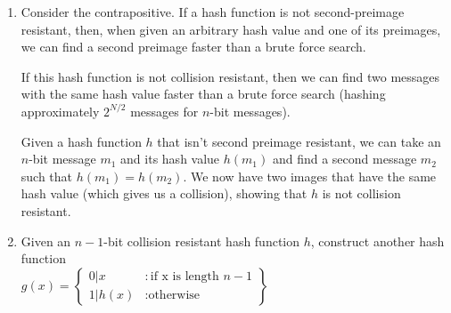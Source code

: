 
\begin{enumerate}
\item Consider the contrapositive. If a hash function is not second-preimage
  resistant, then, when given an arbitrary hash value and one of its preimages,
  we can find a second preimage faster than a brute force
  search.

If this hash function is not collision resistant, then we can find two
messages with the same hash value faster than a brute force search (hashing
approximately $2^{N/2}$ messages for $n$-bit messages).

Given a hash function $h$ that isn't second preimage resistant, we can take
an $n$-bit message $m_1$ and its hash value $h(m_1)$ and find a second
message $m_2$ such that $h(m_1) = h(m_2)$. We now have two images that have
the same hash value (which gives us a collision), showing that $h$ is not
collision resistant.

\item Given an $n-1$-bit collision resistant hash function $h$, construct
	another hash function \cite{jung} \\
  $g(x) = \left\{
    \begin{array}{lr}
      0|x & : \text{if x is length }n-1\\
      1|h(x) & : \text{otherwise}
    \end{array}
    \right\}$ \\


\end{enumerate}
